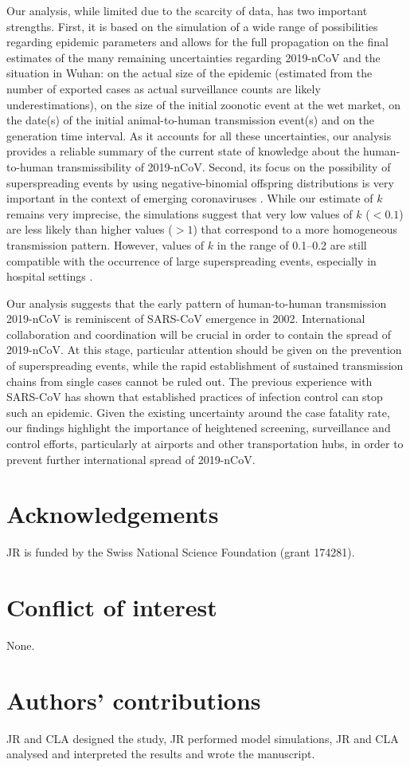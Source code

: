 \documentclass{article}
\begin{document}
Our analysis, while limited due to the scarcity of data, has two important strengths.
First, it is based on the simulation of a wide range of possibilities regarding epidemic parameters and allows for the full propagation on the final estimates of the many remaining uncertainties regarding 2019-nCoV and the situation in Wuhan: on the actual size of the epidemic (estimated from the number of exported cases as actual surveillance counts are likely underestimations), on the size of the initial zoonotic event at the wet market, on the date(s) of the initial animal-to-human transmission event(s) and on the generation time interval.
As it accounts for all these uncertainties, our analysis provides a reliable summary of the current state of knowledge about the human-to-human transmissibility of 2019-nCoV.
Second, its focus on the possibility of superspreading events by using negative-binomial offspring distributions is very important in the context of emerging coronaviruses \cite{Lloyd-Smith:2005,Althaus:2015b}.
While our estimate of $k$ remains very imprecise, the simulations suggest that very low values of $k$ ($< 0.1$) are less likely than higher values ($> 1$) that correspond to a more homogeneous transmission pattern.
However, values of $k$ in the range of 0.1--0.2 are still compatible with the occurrence of large superspreading events, especially in hospital settings \cite{oh2015middle,assiri2013hospital}.

Our analysis suggests that the early pattern of human-to-human transmission 2019-nCoV is reminiscent of SARS-CoV emergence in 2002.
International collaboration and coordination will be crucial in order to contain the spread of 2019-nCoV.
At this stage, particular attention should be given on the prevention of superspreading events, while the rapid establishment of sustained transmission chains from single cases cannot be ruled out.
The previous experience with SARS-CoV has shown that established practices of infection control can stop such an epidemic.
Given the existing uncertainty around the case fatality rate, our findings highlight the importance of heightened screening, surveillance and control efforts, particularly at airports and other transportation hubs, in order to prevent further international spread of 2019-nCoV.



\section*{Acknowledgements}
JR is funded by the Swiss National Science Foundation (grant 174281).
\section*{Conflict of interest}
None.

\section*{Authors' contributions}

JR and CLA designed the study, JR performed model simulations, JR and CLA analysed and interpreted the results and wrote the manuscript.


  
\end{document}
